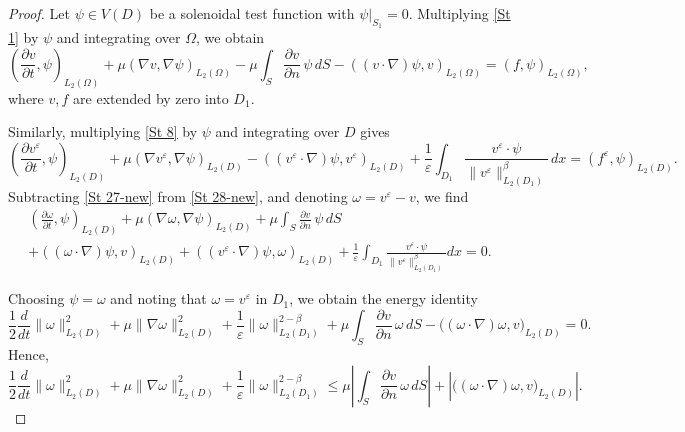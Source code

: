 \documentclass[11pt]{article}
\begin{document}
\begin{proof}
	Let $\psi\in V(D)$ be a solenoidal test function with $\psi|_{S_1}=0$. Multiplying \eqref{St 1} by $\psi$ and integrating over $\Omega$, we obtain
	\begin{equation} \label{St 27-new}
		\left( \frac{\partial v}{\partial t}, \psi \right)_{L_2(\Omega)} 
		+ \mu \left( \nabla v, \nabla \psi \right)_{L_2(\Omega)}
		- \mu \int_{S} \frac{\partial v}{\partial n} \, \psi \, dS
		- \left( (v \cdot \nabla)\psi, v \right)_{L_2(\Omega)} 
		= (f, \psi)_{L_2(\Omega)},
	\end{equation}
	where $v,f$ are extended by zero into $D_1$.
	
	Similarly, multiplying \eqref{St 8} by $\psi$ and integrating over $D$ gives
	\begin{equation} \label{St 28-new}
		\left( \frac{\partial v^{\varepsilon}}{\partial t}, \psi \right)_{L_2(D)} 
		+ \mu \left( \nabla v^{\varepsilon}, \nabla \psi \right)_{L_2(D)}
		- \left( (v^{\varepsilon} \cdot \nabla)\psi, v^{\varepsilon} \right)_{L_2(D)}
		+ \frac{1}{\varepsilon} \int_{D_1} \frac{v^{\varepsilon}\cdot \psi}{\| v^{\varepsilon} \|^\beta_{L_2(D_1)}} \, dx
		= (f^{\varepsilon}, \psi)_{L_2(D)}.
	\end{equation}
		Subtracting \eqref{St 27-new} from \eqref{St 28-new}, and denoting $\omega = v^{\varepsilon} - v$, we find
	\begin{multline*}
	\left( \frac{\partial \omega}{\partial t}, \psi \right)_{L_2(D)} 
	+ \mu(\nabla \omega, \nabla \psi)_{L_2(D)}
	+ \mu \int_{S} \frac{\partial v}{\partial n}\,\psi\, dS \\
	+ \left( (\omega \cdot \nabla)\psi, v \right)_{L_2(D)}
	+ \left( (v^{\varepsilon} \cdot \nabla)\psi, \omega \right)_{L_2(D)}
	+ \frac{1}{\varepsilon} \int_{D_1} \frac{v^{\varepsilon} \cdot \psi}{\|v^{\varepsilon}\|_{L_2(D_1)}^{\beta}} dx = 0.
	\end{multline*}
	
	Choosing $\psi = \omega$ and noting that $\omega=v^{\varepsilon}$ in $D_1$, we obtain the energy identity
	\[
	\frac{1}{2} \frac{d}{dt} \|\omega\|_{L_2(D)}^2 
	+ \mu \|\nabla \omega\|_{L_2(D)}^2
	+ \frac{1}{\varepsilon} \|\omega\|^{2-\beta}_{L_2(D_1)}
	+ \mu \int_S \frac{\partial v}{\partial n}\,\omega \, dS
	- \big( (\omega \cdot \nabla)\omega, v \big)_{L_2(D)} = 0.
	\]
	Hence,
	\begin{equation} \label{St 29-new}
		\frac{1}{2} \frac{d}{dt} \|\omega\|_{L_2(D)}^2 
		+ \mu \|\nabla \omega\|_{L_2(D)}^2
		+ \frac{1}{\varepsilon} \|\omega\|^{2-\beta}_{L_2(D_1)}
		\leq \mu \left| \int_S \frac{\partial v}{\partial n}\,\omega \, dS \right|
		+ \left| \big( (\omega \cdot \nabla)\omega, v \big)_{L_2(D)} \right|.
	\end{equation}
	

\end{proof}
\end{document}
